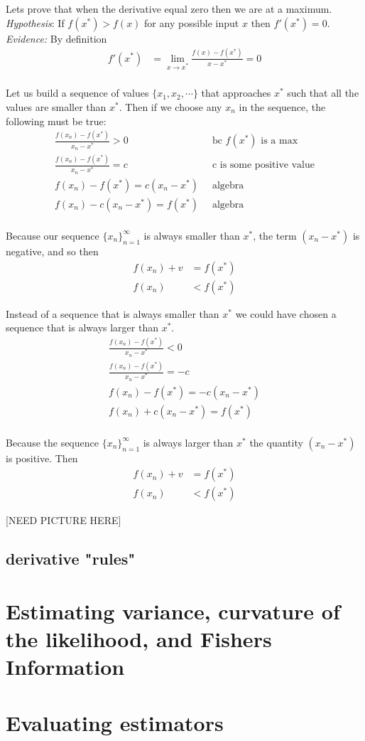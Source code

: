 Lets prove that when the derivative equal zero then we are at a maximum. 
\textit{Hypothesis}: If $f(x^{*}) > f(x)$ for any possible input $x$ then  $f'(x^{*})=0$.
\textit{Evidence:} By definition
\begin{align}
    f'(x^{*}) &= \lim_{x \to x^{*}} \frac{ f(x) - f(x^{*}) }{x-x^{*}} = 0 \\ 
\end{align}

Let us build a sequence of values $\{x_{1}, x_{2}, \cdots \}$ that approaches $x^{*}$ such that all the values are smaller than $x^{*}$. Then if we choose any $x_{n}$ in the sequence, the following must be true:
\begin{align}
    \frac{f(x_{n}) - f(x^{*})}{x_{n}-x^{*}} > 0 & \;\; \text{bc $f(x^{*})$ is a max} \\ 
    \frac{f(x_{n}) - f(x^{*})}{x_{n}-x^{*}} =c  & \;\;  \text{c is some positive value}\\
    f(x_{n}) - f(x^{*}) =c (x_{n}-x^{*})        & \;\;  \text{algebra}\\
    f(x_{n}) - c (x_{n}-x^{*}) = f(x^{*})       & \;\;  \text{algebra}  \\
\end{align}

Because our sequence $\{x_{n}\}_{n=1}^{\infty}$ is always smaller than $x^{*}$, the term  $(x_{n}-x^{*})$ is negative, and so then
\begin{align}
    f(x_{n}) + v &= f(x^{*}) \\ 
    f(x_{n}) &< f(x^{*})
\end{align}

Instead of a sequence that is always smaller than $x^{*}$ we could have chosen a sequence that is always larger than $x^{*}$.
\begin{align}
    \frac{f(x_{n}) - f(x^{*})}{x_{n}-x^{*}} < 0 \\ 
    \frac{f(x_{n}) - f(x^{*})}{x_{n}-x^{*}} = -c \\
    f(x_{n}) - f(x^{*}) = -c (x_{n}-x^{*}) \\
    f(x_{n}) + c (x_{n}-x^{*}) = f(x^{*})  \\
\end{align}

Because the sequence $\{x_{n}\}_{n=1}^{\infty}$ is always larger than $x^{*}$ the quantity $(x_{n}-x^{*})$ is positive. Then 
\begin{align}
    f(x_{n}) + v &= f(x^{*}) \\ 
    f(x_{n}) &< f(x^{*})
\end{align}


[NEED PICTURE HERE]


\subsection{derivative "rules"}



\section{ Estimating variance, curvature of the likelihood, and Fishers Information }


\section{ Evaluating estimators }





